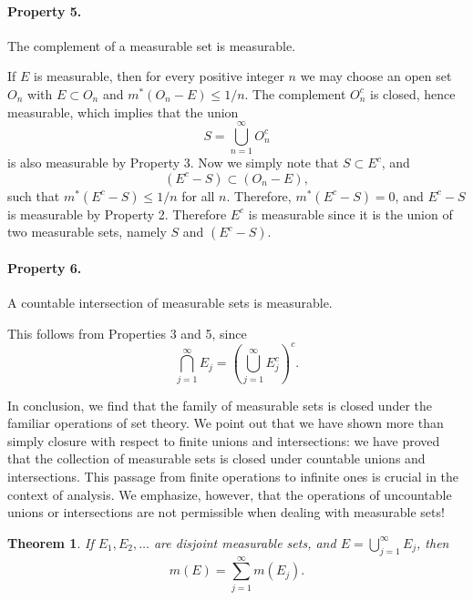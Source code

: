 \documentclass[11pt,openany]{book}
\newtheorem{theorem}{Theorem}[section]
\begin{document}
\paragraph{Property 5.} The complement of a measurable set is measurable.

If $E$ is measurable, then for every positive integer $n$ we may choose an open set $O_n$ with $E\subset O_n$ and $m^*(O_n-E)\le1/n$. The complement $O_n^c$ is closed, hence measurable, which implies that the union
\[
 S=\bigcup_{n=1}^{\infty}O_n^c
\]
is also measurable by Property 3. Now we simply note that $S\subset E^c$, and
\[
 (E^c-S)\subset(O_n-E),
\]
such that $m^*(E^c-S)\le1/n$ for all $n$. Therefore, $m^*(E^c-S)=0$, and $E^c-S$ is measurable by Property 2. Therefore $E^c$ is measurable since it is the union of two measurable sets, namely $S$ and $(E^c-S)$.

\paragraph{Property 6.} A countable intersection of measurable sets is measurable.

This follows from Properties 3 and 5, since
\[
 \bigcap_{j=1}^{\infty}E_j
 =\left(\bigcup_{j=1}^{\infty}E_j^c\right)^c.
\]

In conclusion, we find that the family of measurable sets is closed under the familiar operations of set theory. We point out that we have shown more than simply closure with respect to finite unions and intersections: we have proved that the collection of measurable sets is closed under countable unions and intersections. This passage from finite operations to infinite ones is crucial in the context of analysis. We emphasize, however, that the operations of uncountable unions or intersections are not permissible when dealing with measurable sets!

\begin{theorem}
If $E_1,E_2,\ldots$ are disjoint measurable sets, and $E=\bigcup_{j=1}^{\infty}E_j$, then
\[
 m(E)=\sum_{j=1}^{\infty}m(E_j).
\]
\end{theorem}
\end{document}
